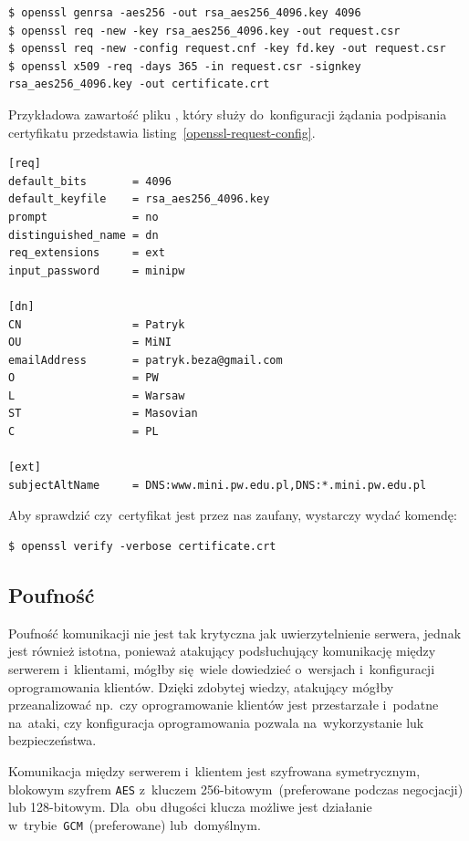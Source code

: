\documentclass[thesis]{subfiles}
\begin{document}
\begin{lstlisting}[numbers=none,caption={Wygenerowanie i~podpisanie certyfikatu \texttt{X.509}},label=openssl-gencert]
$ openssl genrsa -aes256 -out rsa_aes256_4096.key 4096
$ openssl req -new -key rsa_aes256_4096.key -out request.csr
$ openssl req -new -config request.cnf -key fd.key -out request.csr
$ openssl x509 -req -days 365 -in request.csr -signkey rsa_aes256_4096.key -out certificate.crt
\end{lstlisting}

Przykładowa zawartość pliku , który służy do~konfiguracji żądania podpisania certyfikatu przedstawia listing~\ref{openssl-request-config}.

\begin{lstlisting}[numbers=none,caption={Plik z~konfiguracją certyfikatu \texttt{X.509}},label=openssl-request-config]
[req]
default_bits       = 4096
default_keyfile    = rsa_aes256_4096.key
prompt             = no
distinguished_name = dn
req_extensions     = ext
input_password     = minipw

[dn]
CN                 = Patryk
OU                 = MiNI
emailAddress       = patryk.beza@gmail.com
O                  = PW
L                  = Warsaw
ST                 = Masovian
C                  = PL

[ext]
subjectAltName     = DNS:www.mini.pw.edu.pl,DNS:*.mini.pw.edu.pl
\end{lstlisting}

Aby sprawdzić czy~certyfikat jest przez nas zaufany, wystarczy wydać komendę:
\begin{lstlisting}[numbers=none]
$ openssl verify -verbose certificate.crt
\end{lstlisting}

\subsection{Poufność}

Poufność komunikacji nie jest tak krytyczna jak uwierzytelnienie serwera, jednak jest również istotna, ponieważ atakujący podsłuchujący komunikację między serwerem i~klientami, mógłby się~wiele dowiedzieć o~wersjach i~konfiguracji oprogramowania klientów. Dzięki zdobytej wiedzy, atakujący mógłby przeanalizować np.~czy oprogramowanie klientów jest przestarzałe i~podatne na~ataki, czy konfiguracja oprogramowania pozwala na~wykorzystanie luk bezpieczeństwa.

Komunikacja między serwerem i~klientem jest szyfrowana symetrycznym, blokowym szyfrem \texttt{AES} z~kluczem 256-bitowym~(preferowane podczas negocjacji) lub 128-bitowym. Dla~obu długości klucza możliwe jest działanie w~trybie~\texttt{GCM}~(preferowane) lub~domyślnym.
\end{document}
